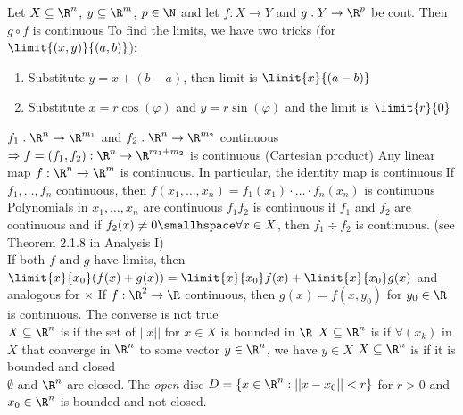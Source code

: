 \shortproposition Let $X \subseteq \R^n$, $y \subseteq \R^m$, $p \in \N$ and let $f: X \rightarrow Y$ and $g: Y \rightarrow \R^p$ be cont. Then $g \circ f$ is continuous
\numberingOff
\inlineremark To find the limits, we have two tricks (for $\limit{(x, y)}{(a, b)}$):
\rmvspace
\begin{enumerate}[noitemsep]
    \item {} Substitute $y = x + (b - a)$, then limit is $\limit{x}{(a - b)}$
    \item {} Substitute $x = r \cos(\varphi)$ and $y = r \sin(\varphi)$ and the limit is $\limit{r}{0}$
\end{enumerate}

\numberingOn\rmvspace
\shortex {} $f_1 : \R^n \rightarrow \R^{m_1}$ and $f_2 : \R^n \rightarrow \R^{m_2}$ continuous
$\Rightarrow f = (f_1, f_2): \R^n \rightarrow \R^{m_1 + m_2}$ is continuous (Cartesian product)
 Any linear map $f: \R^n \rightarrow \R^m$ is continuous. In particular, the identity map is continuous
 If $f_1, \ldots, f_n$ continuous, then $f(x_1, \ldots, x_n) = f_1(x_1) \cdot \ldots \cdot f_n(x_n)$ is continuous
 Polynomials in $x_1, \ldots, x_n$ are continuous
 $f_1f_2$ is continuous if $f_1$ and $f_2$ are continuous and if $f_2(x) \neq 0 \smallhspace \forall x \in X$, then $f_1 \div f_2$ is continuous.
(see Theorem 2.1.8 in Analysis I)\\
 If both $f$ and $g$ have limits, then $\displaystyle \limit{x}{x_0}(f(x) + g(x)) = \limit{x}{x_0} f(x) + \limit{x}{x_0} g(x)$ and analogous for $\times$
 If $f: \R^2 \rightarrow \R$ continuous, then $g(x) = f(x, y_0)$ for $y_0 \in \R$ is continuous. The converse is not true\\
\shortdef {} $X \subseteq \R^n$ is  if the set of $||x||$ for $x \in X$ is bounded in $\R$
 $X \subseteq \R^n$ is  if $\forall (x_k)$ in $X$ that converge in $\R^n$ to some vector $y \in \R^n$, we have $y \in X$
 $X \subseteq \R^n$ is  if it is bounded and closed\\
\shortex {} $\emptyset$ and $\R^n$ are closed.
 The \textit{open} disc $D = \{ x \in \R^n : ||x - x_0|| < r \}$ for $r > 0$ and $x_0 \in \R^n$ is bounded and not closed.
